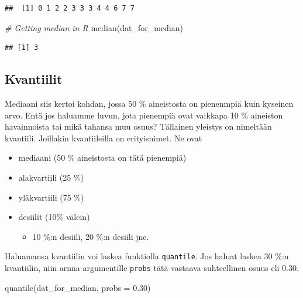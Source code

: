 \documentclass[
]{book}
\newenvironment{Shaded}{\begin{snugshade}}{\end{snugshade}}
\newcommand{\AttributeTok}[1]{\textcolor[rgb]{0.77,0.63,0.00}{#1}}
\newcommand{\CommentTok}[1]{\textcolor[rgb]{0.56,0.35,0.01}{\textit{#1}}}
\newcommand{\FloatTok}[1]{\textcolor[rgb]{0.00,0.00,0.81}{#1}}
\newcommand{\FunctionTok}[1]{\textcolor[rgb]{0.00,0.00,0.00}{#1}}
\newcommand{\NormalTok}[1]{#1}
\providecommand{\tightlist}{%
  \setlength{\itemsep}{0pt}\setlength{\parskip}{0pt}}
\begin{document}
\begin{verbatim}
##  [1] 0 1 2 2 3 3 3 4 4 6 7 7
\end{verbatim}

\begin{Shaded}
\begin{Highlighting}[]
\CommentTok{\# Getting median in R}
\FunctionTok{median}\NormalTok{(dat\_for\_median)}
\end{Highlighting}
\end{Shaded}

\begin{verbatim}
## [1] 3
\end{verbatim}

\hypertarget{kvantiilit}{%
\subsection{Kvantiilit}\label{kvantiilit}}

Mediaani siis kertoi kohdan, jossa 50 \% aineistosta on pienenmpiä kuin kyseinen arvo. Entä jos haluamme luvun, jota pienempiä ovat vaikkapa 10 \% aineiston havainnoista tai mikä tahansa muu osuus? Tällainen yleistys on nimeltään kvantiili. Joillakin kvantiileilla on erityisnimet. Ne ovat

\begin{itemize}
\tightlist
\item
  mediaani (50 \% aineistosta on tätä pienempiä)
\item
  alakvartiili (25 \%)
\item
  yläkvartiili (75 \%)
\item
  desiilit (10\% välein)

  \begin{itemize}
  \tightlist
  \item
    10 \%:n desiili, 20 \%:n desiili jne.
  \end{itemize}
\end{itemize}

Haluamansa kvantiilin voi laskea funktiolla \texttt{quantile}. Jos haluat laskea 30 \%:n kvantiilin, niin arnna argumentille \texttt{probs} tätä vastaava suhteellinen osuus eli 0.30.

\begin{Shaded}
\begin{Highlighting}[]
\FunctionTok{quantile}\NormalTok{(dat\_for\_median, }\AttributeTok{probs =} \FloatTok{0.30}\NormalTok{)}
\end{Highlighting}
\end{Shaded}
\end{document}
